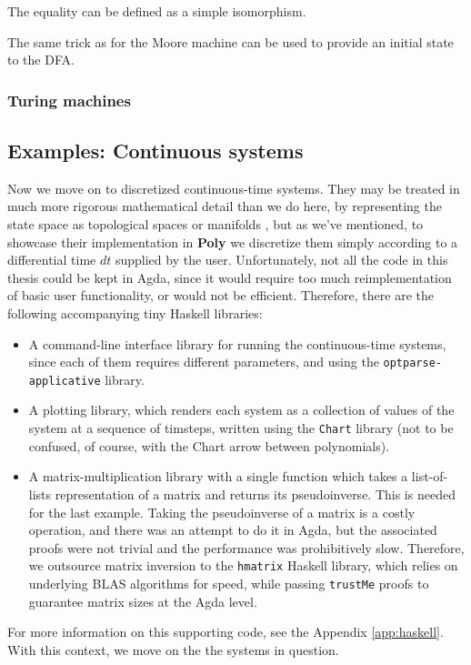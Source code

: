 The equality can be defined as a simple isomorphism.

The same trick as for the Moore machine can be used to provide an initial state to the DFA.


\subsubsection{Turing machines}


\subsection{Examples: Continuous systems}
Now we move on to discretized continuous-time systems. They may be treated in much more rigorous mathematical detail than we do here, by representing the state space as topological spaces or manifolds \cite{css}, but as we've mentioned, to showcase their implementation in \textbf{Poly} we discretize them simply according to a differential time $dt$ supplied by the user.
Unfortunately, not all the code in this thesis could be kept in Agda, since it would require too much reimplementation of basic user functionality, or would not be efficient. Therefore, there are the following accompanying tiny Haskell libraries:
\begin{itemize}
    \item A command-line interface library for running the continuous-time systems, since each of them requires different parameters, and using the \texttt{optparse-applicative}\cite{optparse} library.
    \item A plotting library, which renders each system as a collection of values of the system at a sequence of timsteps, written using the \texttt{Chart}\cite{chart-lib} library (not to be confused, of course, with the Chart arrow between polynomials).
    \item A matrix-multiplication library with a single function which takes a list-of-lists representation of a matrix and returns its pseudoinverse. This is needed for the last example. Taking the pseudoinverse of a matrix is a costly operation, and there was an attempt to do it in Agda, but the associated proofs were not trivial and the performance was prohibitively slow. Therefore, we outsource matrix inversion to the \texttt{hmatrix}\cite{hmatrix} Haskell library, which relies on underlying BLAS \cite{blas} algorithms for speed, while passing \texttt{trustMe} proofs to guarantee matrix sizes at the Agda level.
\end{itemize}
For more information on this supporting code, see the Appendix \ref{app:haskell}.
With this context, we move on the the systems in question.

